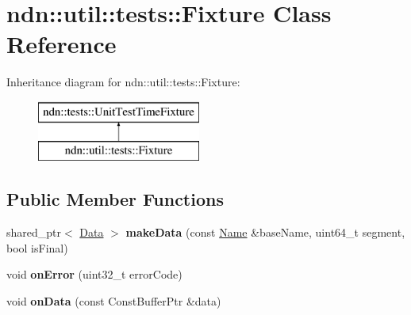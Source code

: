 \hypertarget{classndn_1_1util_1_1tests_1_1Fixture}{}\section{ndn\+:\+:util\+:\+:tests\+:\+:Fixture Class Reference}
\label{classndn_1_1util_1_1tests_1_1Fixture}
Inheritance diagram for ndn\+:\+:util\+:\+:tests\+:\+:Fixture\+:\begin{figure}[H]
\begin{center}
\leavevmode
\includegraphics[height=2.000000cm]{classndn_1_1util_1_1tests_1_1Fixture}
\end{center}
\end{figure}
\subsection*{Public Member Functions}
\begin{DoxyCompactItemize}
\item 
shared\+\_\+ptr$<$ \hyperlink{classndn_1_1Data}{Data} $>$ {\bfseries make\+Data} (const \hyperlink{classndn_1_1Name}{Name} \&base\+Name, uint64\+\_\+t segment, bool is\+Final)\hypertarget{classndn_1_1util_1_1tests_1_1Fixture_a6420bca2b489c369ddf387f4ef90a42d}{}\label{classndn_1_1util_1_1tests_1_1Fixture_a6420bca2b489c369ddf387f4ef90a42d}

\item 
void {\bfseries on\+Error} (uint32\+\_\+t error\+Code)\hypertarget{classndn_1_1util_1_1tests_1_1Fixture_a415cd593e625e1bc3cab9700dc6b73f5}{}\label{classndn_1_1util_1_1tests_1_1Fixture_a415cd593e625e1bc3cab9700dc6b73f5}

\item 
void {\bfseries on\+Data} (const Const\+Buffer\+Ptr \&data)\hypertarget{classndn_1_1util_1_1tests_1_1Fixture_a051a0a4f9658ccd75eeedcef177032e6}{}\label{classndn_1_1util_1_1tests_1_1Fixture_a051a0a4f9658ccd75eeedcef177032e6}

\end{DoxyCompactItemize}

